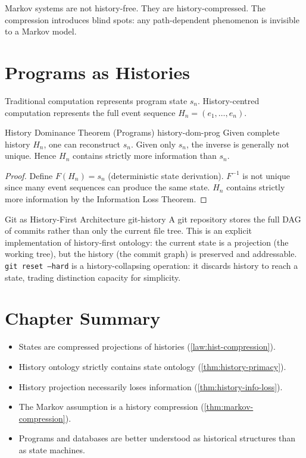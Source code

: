 \documentclass[12pt,twoside,openright]{book}
\newcommand{\csicon} {\marginpar{\tiny\color{DistBlue}\faCode}}
\newenvironment{chapsummary}{%
  \begin{tcolorbox}[colback=DistBlue!5,colframe=DistBlue,
    title={\faBookOpen\enspace Summary},
    fonttitle=\sffamily\bfseries\color{white},
    attach boxed title to top left={yshift=-2mm,xshift=4mm},
    boxed title style={colback=DistBlue,rounded corners}]
  \begin{itemize}[nosep,leftmargin=*]}{%
  \end{itemize}\end{tcolorbox}}
\begin{document}
Markov systems are not history-free. They are
history-compressed. The compression introduces blind spots:
any path-dependent phenomenon is invisible to a Markov
model.

\section{Programs as Histories}
\label{sec:ch4-programs}

\csicon
Traditional computation represents program state $s_n$.
History-centred computation represents the full event
sequence $H_n = (e_1, \ldots, e_n)$.

\begin{theorem}{History Dominance Theorem (Programs)}%
  {history-dom-prog}
  Given complete history $H_n$, one can reconstruct $s_n$.
  Given only $s_n$, the inverse is generally not unique.
  Hence $H_n$ contains strictly more information than $s_n$.
\end{theorem}

\begin{proof}
  Define $F(H_n) = s_n$ (deterministic state derivation).
  $F^{-1}$ is not unique since many event sequences can
  produce the same state. $H_n$ contains strictly more
  information by the Information Loss Theorem.
\end{proof}

\begin{example}{Git as History-First Architecture}%
  {git-history}
  \csicon
  A git repository stores the full DAG of commits rather
  than only the current file tree. This is an explicit
  implementation of history-first ontology: the current
  state is a projection (the working tree), but the
  history (the commit graph) is preserved and addressable.
  \texttt{git reset --hard} is a history-collapsing
  operation: it discards history to reach a state,
  trading distinction capacity for simplicity.
\end{example}

\section*{Chapter Summary}
\begin{chapsummary}
  \item States are compressed projections of histories
        (\cref{law:hist-compression}).
  \item History ontology strictly contains state ontology
        (\cref{thm:history-primacy}).
  \item History projection necessarily loses information
        (\cref{thm:history-info-loss}).
  \item The Markov assumption is a history compression
        (\cref{thm:markov-compression}).
  \item Programs and databases are better understood as
        historical structures than as state machines.
\end{chapsummary}
\end{document}
